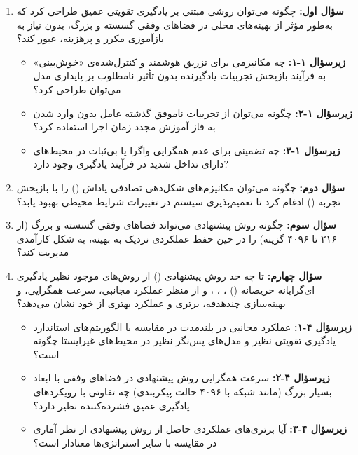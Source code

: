 \documentclass[oneside,openany,phd]{TMU-Thesis}
\begin{document}
\begin{enumerate}
  \item \textbf{سؤال اول:} چگونه می‌توان روشی مبتنی بر یادگیری تقویتی عمیق طراحی کرد که به‌طور مؤثر از بهینه‌های محلی در فضاهای وفقی گسسته و بزرگ، بدون نیاز به بازآموزی مکرر و پرهزینه، عبور کند؟
  \begin{itemize}
      \item \textbf{زیرسؤال ۱-۱:} چه مکانیزمی برای تزریق هوشمند و کنترل‌شده‌ی «خوش‌بینی» به فرآیند بازپخش تجربیات یادگیرنده بدون تأثیر نامطلوب بر پایداری مدل می‌توان طراحی کرد؟
      \item \textbf{زیرسؤال ۱-۲:} چگونه می‌توان از تجربیات ناموفق گذشته عامل بدون وارد شدن به فاز آموزش مجدد زمان اجرا استفاده کرد؟
      \item \textbf{زیرسؤال ۱-۳:} چه تضمینی برای عدم همگرایی واگرا یا بی‌ثبات در محیط‌های دارای تداخل شدید در فرآیند یادگیری وجود دارد?
  \end{itemize}
  
  \item \textbf{سؤال دوم:} چگونه می‌توان مکانیزم‌های شکل‌دهی تصادفی پاداش () را با بازپخش تجربه () ادغام کرد تا تعمیم‌پذیری سیستم در تغییرات شرایط محیطی بهبود یابد؟
  
  \item \textbf{سؤال سوم:} چگونه روش پیشنهادی می‌تواند فضاهای وفقی گسسته و بزرگ (از ۲۱۶ تا ۴۰۹۶ گزینه‌) را در حین حفظ عملکردی نزدیک به بهینه، به شکل کارآمدی مدیریت کند؟
  
  \item \textbf{سؤال چهارم:} تا چه حد روش پیشنهادی () از روش‌های موجود نظیر یادگیری ای‌گرایانه حریصانه () \cite{mnih2015human}،  \cite{andrychowicz2017her}،  \cite{he2020softher}،  \cite{metzger2022realizing} و  \cite{kachi2023hybrid} از منظر عملکرد مجانبی، سرعت همگرایی، و بهینه‌سازی چندهدفه، برتری و عملکرد بهتری از خود نشان می‌دهد؟
  \begin{itemize}
      \item \textbf{زیرسؤال ۴-۱:} عملکرد مجانبی  در بلندمدت در مقایسه با الگوریتم‌های استاندارد یادگیری تقویتی نظیر  و مدل‌های پس‌نگر نظیر  در محیط‌های غیرایستا چگونه است؟
      \item \textbf{زیرسؤال ۴-۲:} سرعت همگرایی روش پیشنهادی در فضاهای وفقی با ابعاد بسیار بزرگ (مانند شبکه با ۴۰۹۶ حالت پیکربندی) چه تفاوتی با رویکردهای یادگیری عمیق فشرده‌کننده نظیر  دارد؟
      \item \textbf{زیرسؤال ۴-۳:} آیا برتری‌های عملکردی حاصل از روش پیشنهادی از نظر آماری در مقایسه با سایر استراتژی‌ها معنادار است؟
  \end{itemize}
\end{enumerate}
\end{document}
